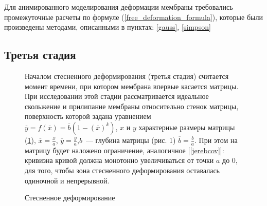 	
	Для анимированного моделирования деформации мембраны требовались промежуточные
	расчеты по формуле (\ref{free_deformation_formula}), которые были произведены методами, описанными в пунктах: \ref{gauss}, \ref{simpson}
	\newpage
	\subsection{Третья стадия}
	\begin{figure}[h!]
		\begin{minipage}[h]{0.48\linewidth}

				
				\def\svgwidth{\columnwidth}
				\label{quad_matrix_pic}
			\caption{ Стесненное деформирование } 
		\end{minipage}
		\hfill
		\begin{minipage}[h]{0.48\linewidth}	
Началом стесненного деформирования (третья стадия) считается момент времени, при котором мембрана впервые касается матрицы. При исследовании этой стадии рассматривается идеальное скольжение и прилипание мембраны относительно стенок матрицы,  поверхность которой задана уравнением $\overline{y} = f(\overline{x}) = \overline{b}(1-(\overline{x})^k)$, $x$ и $y$ характерные размеры матрицы (\ref{quad_matrix_pic}), $\overline{x} = \frac x a$, $\overline{y} = \frac y a$,$b$~--- глубина матрицы (рис. 1) $\overline{b} = \frac b a$. При этом на матрицу будет наложено ограничение, аналогичное 
[\ref{jerebcov}]: кривизна кривой должна монотонно увеличиваться от точки $a$ до $0$, для того, чтобы зона стесненного деформирования оставалась одиночной и непрерывной.
	
		\end{minipage}
		\label{quad_matrix_pic}
	\end{figure}
	
